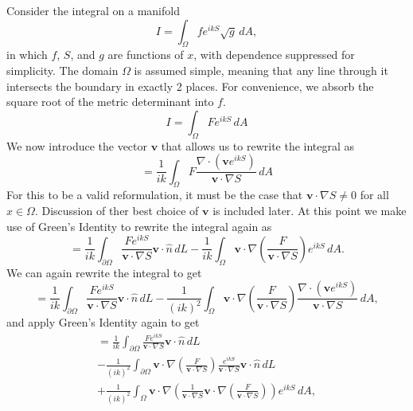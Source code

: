 \documentclass{article}
\theoremstyle{plain}
\begin{document}
Consider the integral on a manifold
\begin{equation}
	I = \int_\Omega f e^{ikS} \sqrt{g} \,dA,
\end{equation}
in which $f$, $S$, and $g$ are functions of $x$, with dependence suppressed for simplicity.
The domain $\Omega$ is assumed simple, meaning that any line through it intersects the boundary in exactly 2 places.
For convenience, we absorb the square root of the metric determinant into $f$.
\begin{equation}
	I = \int_\Omega F e^{ikS} \,dA
\end{equation}
We now introduce the vector $\mathbf{v}$ that allows us to rewrite the integral as
\begin{equation}
	= \frac{1}{ik} \int_\Omega F \frac{\nabla\cdot\left( \mathbf{v}e^{ikS} \right)}{\mathbf{v}\cdot\nabla S} \,dA
\end{equation}
For this to be a valid reformulation, it must be the case that $\mathbf{v}\cdot\nabla S \neq 0$ for all $x\in\Omega$.
Discussion of ther best choice of $\mathbf{v}$ is included later.
At this point we make use of Green's Identity to rewrite the integral again as
\begin{equation}
	= \frac{1}{ik} \int_{\partial\Omega} \frac{Fe^{ikS}}{\mathbf{v}\cdot\nabla S} \mathbf{v}\cdot\hat{n} \,dL
	- \frac{1}{ik} \int_\Omega \mathbf{v}\cdot\nabla\left( \frac{F}{\mathbf{v}\cdot\nabla S} \right) e^{ikS} \,dA.
\end{equation}
We can again rewrite the integral to get
\begin{equation}
	= \frac{1}{ik} \int_{\partial\Omega} \frac{Fe^{ikS}}{\mathbf{v}\cdot\nabla S} \mathbf{v}\cdot\hat{n} \,dL
	- \frac{1}{(ik)^2} \int_\Omega \mathbf{v}\cdot\nabla\left( \frac{F}{\mathbf{v}\cdot\nabla S} \right)
	\frac{\nabla\cdot\left( \mathbf{v}e^{ikS} \right)}{\mathbf{v}\cdot\nabla S} \,dA,
\end{equation}
and apply Green's Identity again to get
\begin{multline}
	= \frac{1}{ik} \int_{\partial\Omega} \frac{Fe^{ikS}}{\mathbf{v}\cdot\nabla S} \mathbf{v}\cdot\hat{n} \,dL \\
	- \frac{1}{(ik)^2} \int_{\partial\Omega} \mathbf{v}\cdot\nabla\left( \frac{F}{\mathbf{v}\cdot\nabla S} \right)
	\frac{e^{ikS}}{\mathbf{v}\cdot\nabla S} \mathbf{v}\cdot\hat{n} \,dL \\
	+ \frac{1}{(ik)^2} \int_{\Omega} \mathbf{v}\cdot\nabla\left( \frac{1}{\mathbf{v}\cdot\nabla S} 
	\mathbf{v}\cdot\nabla\left( \frac{F}{\mathbf{v}\cdot\nabla S} \right) \right) e^{ikS} \,dA,
\end{multline}
\end{document}
